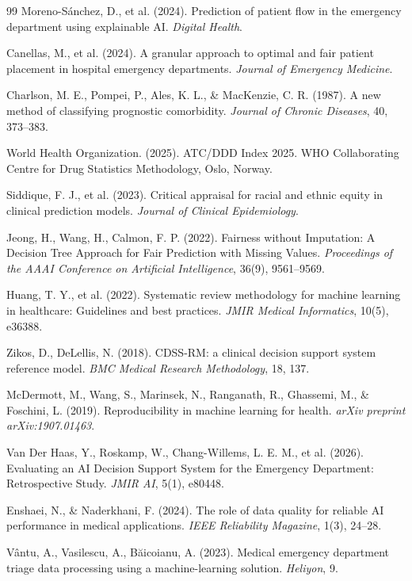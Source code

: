 \documentclass[harvard,article]{frontiersinFPHY_FAMS}
\begin{document}
\begin{thebibliography}{99}
 Moreno-Sánchez, D., et al. (2024). Prediction of patient flow in the emergency department using explainable AI. \textit{Digital Health}.

 Canellas, M., et al. (2024). A granular approach to optimal and fair patient placement in hospital emergency departments. \textit{Journal of Emergency Medicine}.

 Charlson, M. E., Pompei, P., Ales, K. L., \& MacKenzie, C. R. (1987). A new method of classifying prognostic comorbidity. \textit{Journal of Chronic Diseases}, 40, 373--383.

 World Health Organization. (2025). ATC/DDD Index 2025. WHO Collaborating Centre for Drug Statistics Methodology, Oslo, Norway.

 Siddique, F. J., et al. (2023). Critical appraisal for racial and ethnic equity in clinical prediction models. \textit{Journal of Clinical Epidemiology}.

 Jeong, H., Wang, H., Calmon, F. P. (2022). Fairness without Imputation: A Decision Tree Approach for Fair Prediction with Missing Values. \textit{Proceedings of the AAAI Conference on Artificial Intelligence}, 36(9), 9561--9569.

 Huang, T. Y., et al. (2022). Systematic review methodology for machine learning in healthcare: Guidelines and best practices. \textit{JMIR Medical Informatics}, 10(5), e36388.

 Zikos, D., DeLellis, N. (2018). CDSS-RM: a clinical decision support system reference model. \textit{BMC Medical Research Methodology}, 18, 137.

 McDermott, M., Wang, S., Marinsek, N., Ranganath, R., Ghassemi, M., \& Foschini, L. (2019). Reproducibility in machine learning for health. \textit{arXiv preprint arXiv:1907.01463}.

 Van Der Haas, Y., Roskamp, W., Chang-Willems, L. E. M., et al. (2026). Evaluating an AI Decision Support System for the Emergency Department: Retrospective Study. \textit{JMIR AI}, 5(1), e80448.

 Enshaei, N., \& Naderkhani, F. (2024). The role of data quality for reliable AI performance in medical applications. \textit{IEEE Reliability Magazine}, 1(3), 24--28.

 Vântu, A., Vasilescu, A., Băicoianu, A. (2023). Medical emergency department triage data processing using a machine-learning solution. \textit{Heliyon}, 9.


\end{thebibliography}
\end{document}

